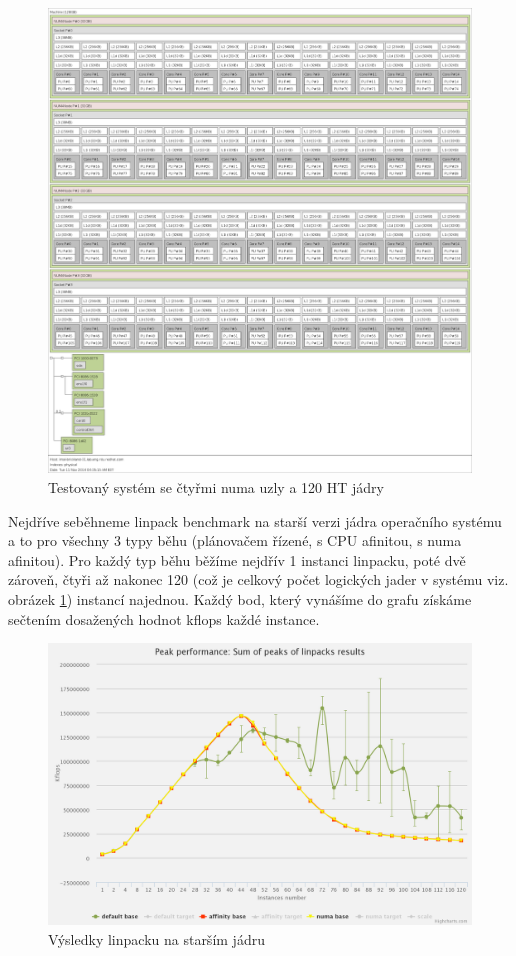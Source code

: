 \documentclass[
  field=ainfk,
  biblatex,
  glossaries,
  index
]{kidiplom}
\begin{document}
\begin{figure}[p]
\includegraphics[scale=0.2]{obrazky/lsTOPO-brickland.png}
\caption{Testovaný systém se čtyřmi numa uzly a 120 HT jádry}
\label{4 numa NODE system scheme}
\end{figure}

Nejdříve seběhneme linpack benchmark na starší verzi jádra operačního systému a to pro všechny 3 typy běhu (plánovačem řízené, s CPU afinitou, s numa afinitou). Pro každý typ běhu běžíme nejdřív 1 instanci linpacku, poté dvě zároveň, čtyři až nakonec 120 (což je celkový počet logických jader v systému viz. obrázek \ref{4 numa NODE system scheme}) instancí najednou. Každý bod, který vynášíme do grafu získáme sečtením dosažených hodnot kflops každé instance.

\begin{figure}[ht]
\center
\includegraphics[scale=0.16]{obrazky/LinpackBaseChart.png}
\caption{Výsledky linpacku na starším jádru}
\label{older kernel linpack results}
\end{figure}
\end{document}
